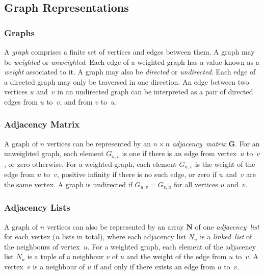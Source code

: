 \subsection{Graph Representations}

\subsubsection{Graphs}

A \emph{graph} comprises a finite set of vertices and edges between them.
A graph may be \emph{weighted} or \emph{unweighted}.
Each edge of a weighted graph has a value known as a \emph{weight} associated to it.
A graph may also be \emph{directed} or \emph{undirected}.
Each edge of a directed graph may only be traversed in one direction.
An edge between two vertices \( u \) and~\( v \) in an undirected graph can be interpreted as a pair of directed edges from \( u \) to~\( v \), and from \( v \) to~\( u \).

\subsubsection{Adjacency Matrix}

A graph of \( n \) vertices can be represented by an \( n \times n \) \emph{adjacency~matrix} \( \mathbf{G} \).
For an unweighted graph, each element \( G_{u,v} \) is one if there is an edge from vertex~\( u \) to~\( v \), or zero otherwise.
For a weighted graph, each element \( G_{u,v} \) is the weight of the edge from \( u \) to~\( v \), positive infinity if there is no such edge, or zero if \( u \) and~\( v \) are the same vertex.
A graph is undirected if \( G_{u,v} = G_{v,u} \) for all vertices \( u \) and~\( v \).

\subsubsection{Adjacency Lists}

A graph of \( n \) vertices can also be represented by an array \( \boldsymbol{N} \) of one \emph{adjacency~list} for each vertex (\( n \) lists in total), where each adjacency list \( N_{u} \) is a \emph{linked~list} of the neighbours of vertex~\( u \).
For a weighted graph, each element of the adjacency list \( N_{u} \) is a tuple of a neighbour \( v \) of \( u \) and the weight of the edge from \( u \) to~\( v \).
A vertex~\( v \) is a neighbour of \( u \) if and only if there exists an edge from \( u \) to~\( v \).

